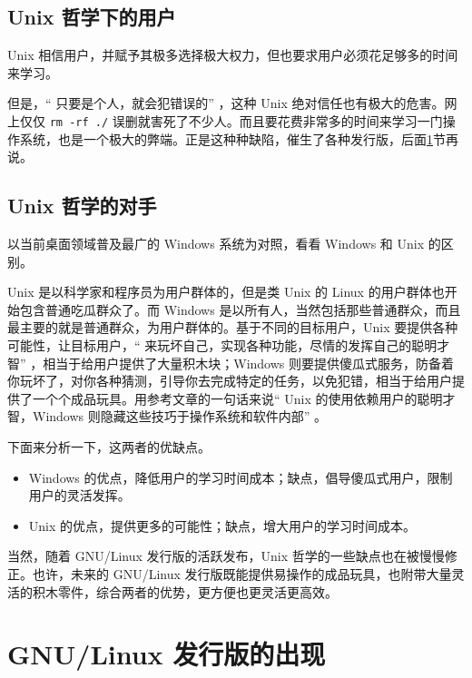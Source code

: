 \documentclass[doctor,openright,twoside]{sjtuthesis}
\providecommand{\tightlist}{%
    \setlength{\itemsep}{0pt}\setlength{\parskip}{0pt}}
\newcommand{\passthrough}[1]{#1}
\theoremstyle{plain}
\theoremstyle{definition}
\theoremstyle{remark}
\theoremstyle{ocrenumbox}
\theoremstyle{plain}
\begin{document}
\hypertarget{unix--2}{%
\subsection{Unix 哲学下的用户}\label{unix--2}}

Unix 相信用户，并赋予其极多选择极大权力，但也要求用户必须花足够多的时间来学习。

但是，`` 只要是个人，就会犯错误的'' ，这种 Unix 绝对信任也有极大的危害。网上仅仅 \passthrough{\lstinline!rm -rf ./!} 误删就害死了不少人。而且要花费非常多的时间来学习一门操作系统，也是一个极大的弊端。正是这种种缺陷，催生了各种发行版，后面\ref{chap:linux-intro:distro}节再说。

\hypertarget{unix--3}{%
\subsection{Unix 哲学的对手}\label{unix--3}}

以当前桌面领域普及最广的 Windows 系统为对照，看看 Windows 和 Unix 的区别。

Unix 是以科学家和程序员为用户群体的，但是类 Unix 的 Linux 的用户群体也开始包含普通吃瓜群众了。而 Windows 是以所有人，当然包括那些普通群众，而且最主要的就是普通群众，为用户群体的。基于不同的目标用户，Unix 要提供各种可能性，让目标用户，`` 来玩坏自己，实现各种功能，尽情的发挥自己的聪明才智'' ，相当于给用户提供了大量积木块；Windows 则要提供傻瓜式服务，防备着你玩坏了，对你各种猜测，引导你去完成特定的任务，以免犯错，相当于给用户提供了一个个成品玩具。用参考文章的一句话来说`` Unix 的使用依赖用户的聪明才智，Windows 则隐藏这些技巧于操作系统和软件内部'' 。

下面来分析一下，这两者的优缺点。

\begin{itemize}
\tightlist
\item
  Windows 的优点，降低用户的学习时间成本；缺点，倡导傻瓜式用户，限制用户的灵活发挥。
\item
  Unix 的优点，提供更多的可能性；缺点，增大用户的学习时间成本。
\end{itemize}

当然，随着 GNU/Linux 发行版的活跃发布，Unix 哲学的一些缺点也在被慢慢修正。也许，未来的 GNU/Linux 发行版既能提供易操作的成品玩具，也附带大量灵活的积木零件，综合两者的优势，更方便也更灵活更高效。

\hypertarget{chap:linux-intro:distro}{%
\section{GNU/Linux 发行版的出现}\label{chap:linux-intro:distro}}
\end{document}
